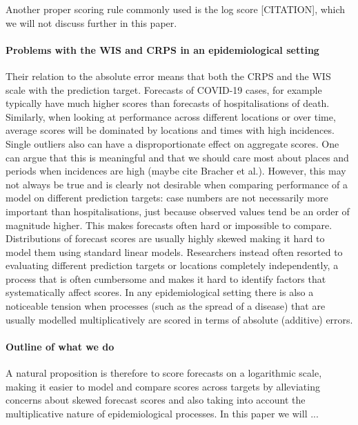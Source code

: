 \documentclass{article}
\begin{document}
Another proper scoring rule commonly used is the log score [CITATION], which we will not discuss further in this paper.  

\paragraph{Problems with the WIS and CRPS in an epidemiological setting}
Their relation to the absolute error means that both the CRPS and the WIS scale with the prediction target. Forecasts of COVID-19 cases, for example typically have much higher scores than forecasts of hospitalisations of death. Similarly, when looking at performance across different locations or over time, average scores will be dominated by locations and times with high incidences. Single outliers also can have a disproportionate effect on aggregate scores. One can argue that this is meaningful and that we should care most about places and periods when incidences are high (maybe cite Bracher et al.). However, this may not always be true and is clearly not desirable when comparing performance of a model on different prediction targets: case numbers are not necessarily more important than hospitalisations, just because observed values tend be an order of magnitude higher. This makes forecasts often hard or impossible to compare. Distributions of forecast scores are usually highly skewed making it hard to model them using standard linear models. Researchers instead often resorted to evaluating different prediction targets or locations completely independently, a process that is often cumbersome and makes it hard to identify factors that systematically affect scores. In any epidemiological setting there is also a noticeable tension when processes (such as the spread of a disease) that are usually modelled multiplicatively are scored in terms of absolute (additive) errors. 

\paragraph{Outline of what we do} 
A natural proposition is therefore to score forecasts on a logarithmic scale, making it easier to model and compare scores across targets by alleviating concerns about skewed forecast scores and also taking into account the multiplicative nature of epidemiological processes. In this paper we will ...
\end{document}
